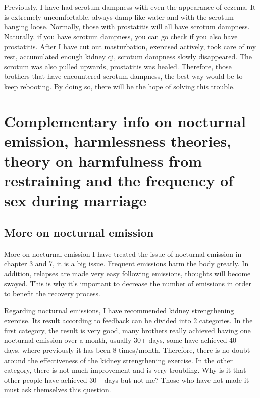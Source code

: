 \documentclass[
]{book}
\begin{document}
Previously, I have had scrotum dampness with even the appearance of eczema. It is extremely uncomfortable, always damp like water and with the scrotum hanging loose. Normally, those with prostatitis will all have scrotum dampness. Naturally, if you have scrotum dampness, you can go check if you also have prostatitis. After I have cut out masturbation, exercised actively, took care of my rest, accumulated enough kidney qi, scrotum dampness slowly disappeared. The scrotum was also pulled upwards, prostatitis was healed. Therefore, those brothers that have encountered scrotum dampness, the best way would be to keep rebooting. By doing so, there will be the hope of solving this trouble.

\hypertarget{complementary-info-on-nocturnal-emission-harmlessness-theories-theory-on-harmfulness-from-restraining-and-the-frequency-of-sex-during-marriage}{%
\chapter{Complementary info on nocturnal emission, harmlessness theories, theory on harmfulness from restraining and the frequency of sex during marriage}\label{complementary-info-on-nocturnal-emission-harmlessness-theories-theory-on-harmfulness-from-restraining-and-the-frequency-of-sex-during-marriage}}

\hypertarget{more-on-nocturnal-emission}{%
\section{More on nocturnal emission}\label{more-on-nocturnal-emission}}

More on nocturnal emission
I have treated the issue of nocturnal emission in chapter 3 and 7, it is a big issue. Frequent emissions harm the body greatly. In addition, relapses are made very easy following emissions, thoughts will become swayed. This is why it's important to decrease the number of emissions in order to benefit the recovery process.

Regarding nocturnal emissions, I have recommended kidney strengthening exercise. Its result according to feedback can be divided into 2 categories. In the first category, the result is very good, many brothers really achieved having one nocturnal emission over a month, usually 30+ days, some have achieved 40+ days, where previously it has been 8 times/month. Therefore, there is no doubt around the effectiveness of the kidney strengthening exercise. In the other category, there is not much improvement and is very troubling. Why is it that other people have achieved 30+ days but not me? Those who have not made it must ask themselves this question.
\end{document}
